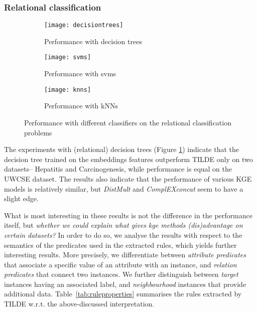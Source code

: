\subsubsection{Relational classification}


\begin{figure}[!ht]
	\centering
	\begin{subfigure}{0.98\linewidth}
		\centering
		\texttt{[image: decisiontrees]}
		\caption{Performance with decision trees\label{fig:dtres}}
	\end{subfigure}

	\begin{subfigure}{0.98\linewidth}
		\centering
		\texttt{[image: svms]}

		\caption{Performance with svms\label{fig:svms}}
	\end{subfigure}

	\begin{subfigure}{0.98\linewidth}
		\centering
		\texttt{[image: knns]}

		\caption{Performance with kNNs\label{fig:knns}}
	\end{subfigure}

	\caption{Performance with different classifiers on the relational classification problems}
\end{figure}








The experiments with (relational) decision trees (Figure \ref{fig:dtres}) indicate that the decision tree trained on the embeddings features outperform TILDE only on two datasets-- Hepatitis and Carcinogenesis, while performance is equal on the UWCSE dataset.
The results also indicate that the performance of various KGE models is relatively similar, but \textit{DistMult} and \textit{ComplEXconcat} seem to have a slight edge.



What is most interesting in these results is not the difference in the performance itself, but \textit{whether we could explain what gives \gls{kge} methods (dis)advantage on certain datasets?}
In order to do so, we analyse the results with respect to the semantics of the predicates used in the extracted rules, which yields further interesting results.
More precisely, we differentiate between \textit{attribute predicates} that associate a specific value of an attribute with an instance, and \textit{relation predicates} that connect two instances.
We further distinguish between \textit{target} instances having an associated label, and \textit{neighbourhood} instances that provide additional data.
Table~\ref{tab:ruleproperties} summarises the rules extracted by TILDE w.r.t. the above-discussed interpretation.



